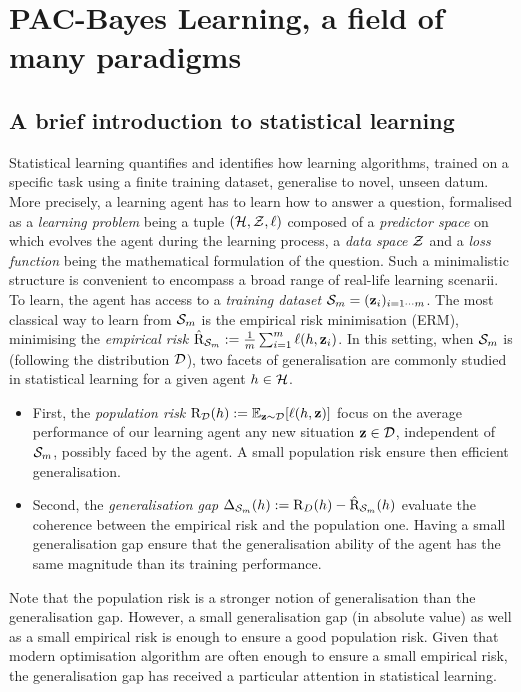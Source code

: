 \chapter[PAC-Bayes Learning, a field of many paradigms]{PAC-Bayes Learning, a field of many paradigms}
\label{chap:intro-pac-bayes}

\minitoc

\addchapterlof
\addchapterloa
\addchapterloe

\section{A brief introduction to statistical learning}
\label{sec: intro-stat-learning}
Statistical learning \citep{vapnik1999overview,james2013introduction} quantifies and identifies how learning algorithms, trained on a specific task using a finite training dataset, generalise to novel, unseen datum. More precisely, a learning agent has to learn how to answer a question, formalised as a \emph{learning problem} being a tuple $(\H,\Z,\ell)$ composed of a \emph{predictor space} on which evolves the agent during the learning process, a \emph{data space} $\Z$ and a \emph{loss function} being the mathematical formulation of the question. Such a minimalistic structure is convenient to encompass a broad range of real-life learning scenarii. To learn, the agent has access to a \emph{training dataset} $\S_m= (\z_i)_{i=1\cdots m}$. The most classical way to learn from $\Sm$ is the empirical risk minimisation (ERM), minimising the \emph{empirical risk} $\Riskhat_{\Sm}:= \frac{1}{m} \sum_{i=1}^m \ell(h,\z_i)$. In this setting, when $\S_m$ is \iid (following the distribution $\D$), two facets of generalisation are commonly studied in statistical learning for a given agent $h\in\H$.

\begin{itemize}
    \item First, the \emph{population risk} $\Risk_\D(h):= \mathbb{E}_{\z\sim\D}[\ell(h,\z)]$ focus on the average performance of our learning agent \wrt any new situation $\z\in\D$, independent of $\S_m$, possibly faced by the agent. A small population risk ensure then efficient generalisation.   
    \item Second, the \emph{generalisation gap}  $\Delta_{\Sm}(h):= \Risk_D(h) - \Riskhat_{\Sm}(h)$ evaluate the coherence between the empirical risk and the population one. Having a small generalisation gap ensure that the generalisation ability of the agent has the same magnitude than its training performance. 
\end{itemize}
Note that the population risk is a stronger notion of generalisation than the generalisation gap. However, a small generalisation gap (in absolute value) as well as a small empirical risk is enough to ensure a good population risk. Given that modern optimisation algorithm are often enough to ensure a small empirical risk, the generalisation gap has received a particular attention in statistical learning. 

